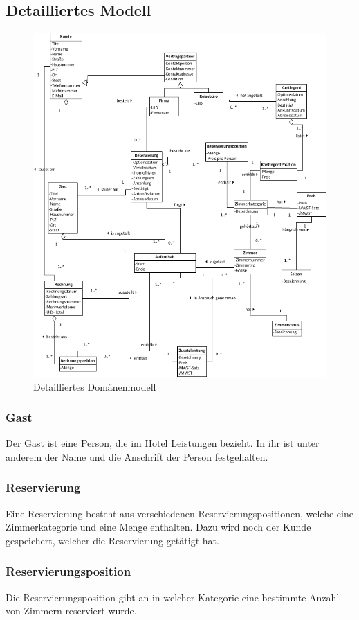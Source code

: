 \documentclass[10pt,a4paper,titlepage]{article}
\begin{document}
\subsection{Detailliertes Modell}
\begin{figure}[h]
	\includegraphics[width=\linewidth]{Images/Domaenenmodell.png}
	\caption{Detailliertes Domänenmodell}
\end{figure}
\subsubsection{\Gls{Gast}}
Der \Gls{Gast} ist eine Person, die im Hotel Leistungen bezieht. In ihr ist unter anderem der Name und die Anschrift der Person festgehalten.
\subsubsection{\Gls{Reservierung}}
Eine \Gls{Reservierung} besteht aus verschiedenen Reservierungspositionen, welche eine Zimmerkategorie und eine Menge enthalten. Dazu wird noch der \Gls{Kunde} gespeichert, welcher die \Gls{Reservierung} getätigt hat.
\subsubsection{Reservierungsposition}
Die Reservierungsposition gibt an in welcher Kategorie eine bestimmte Anzahl von
\Gls{Zimmer}n reserviert wurde.
\end{document}
